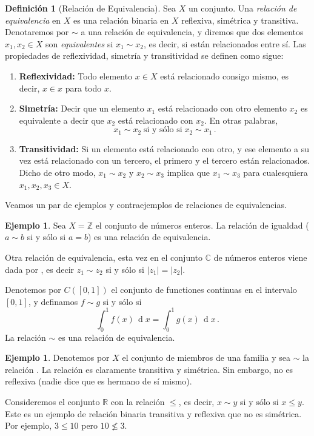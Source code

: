 \documentclass[a4paper,11pt]{amsart}
\DeclareMathOperator{\dif}{d}
\theoremstyle{plain}
\theoremstyle{definition}
\newtheorem{defi}[thm]{Definición}
\newtheorem{ej}[thm]{Ejemplo}
\theoremstyle{remark}
\begin{document}
\begin{defi}[Relación de Equivalencia]
Sea $X$ un conjunto. Una \textit{relación de equivalencia} en $X$ es una relación binaria en $X$ reflexiva, simétrica y transitiva. Denotaremos por $\sim$ a una relación de equivalencia, y diremos que dos elementos $x_1, x_2 \in X$ son \textit{equivalentes} si $x_1 \sim x_2$, es decir, si están relacionados entre sí. Las propiedades de reflexividad, simetría y transitividad se definen como sigue: 
\begin{enumerate}[label = \arabic*)]
    \item \textbf{Reflexividad:} Todo elemento $x \in X$ está relacionado consigo mismo, es decir, $x \in x$ para todo $x$.
    \item \textbf{Simetría:} Decir que un elemento $x_1$ está relacionado con otro elemento $x_2$ es equivalente a decir que $x_2$ está relacionado con $x_2$. En otras palabras, 
    \[ x_1 \sim x_2 \; \text{si y sólo si} \; x_2 \sim x_1 \, .\]
    \item \textbf{Transitividad:} Si un elemento está relacionado con otro, y ese elemento a su vez está relacionado con un tercero, el primero y el tercero están relacionados. Dicho de otro modo, $x_1 \sim x_2$ y $x_2 \sim x_3$ implica que $x_1 \sim x_3$ para cualesquiera $x_1, x_2, x_3 \in X$.
\end{enumerate}
\end{defi}

Veamos un par de ejemplos y contraejemplos de relaciones de equivalencias.

\begin{ej}
Sea $X = \mathbb{Z}$ el conjunto de números enteros. La relación de igualdad ($a \sim b$ si y sólo si $a = b$) es una relación de equivalencia. 

Otra relación de equivalencia, esta vez en el conjunto $\mathbb{C}$ de números enteros viene dada por , es decir $z_1 \sim z_2$ si y sólo si $|z_1| = |z_2|$.


Denotemos por $C([0, 1])$ el conjunto de functiones continuas en el intervalo $[0, 1]$, y definamos $f \sim g$ si y sólo si 
\[ \int_0^1 f(x)\, \dif x = \int_0^1 g(x) \, \dif x \, . \]
La relación $\sim$ es una relación de equivalencia.
\end{ej}

\begin{ej}
Denotemos por $X$ el conjunto de miembros de una familia y sea $\sim$ la relación . La relación es claramente transitiva y simétrica. Sin embargo, no es reflexiva (nadie dice que es hermano de sí mismo).


Consideremos el conjunto $\mathbb{R}$ con la relación $\leq$, es decir, $x \sim y$ si y sólo si $x \leq y$. Este es un ejemplo de relación binaria transitiva y reflexiva que no es simétrica. Por ejemplo, $3 \leq 10$ pero $10 \not \leq 3$.
\end{ej}
\end{document}
